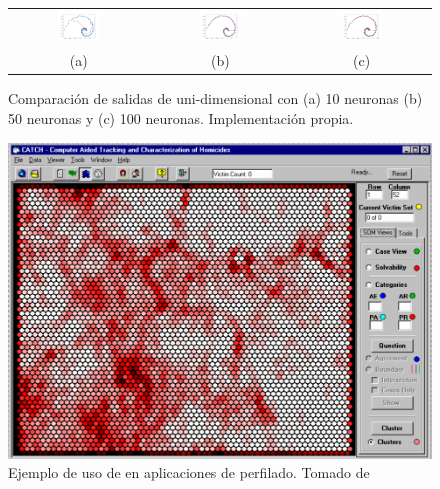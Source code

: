 \begin{figure}[H]
   \centering
   \begin{tabular}{ccc}
   \includegraphics[width=0.32\textwidth]{Figures/som-implementation-example10.pdf} & %
   \includegraphics[width=0.32\textwidth]{Figures/som-implementation-example50.pdf} & %
   \includegraphics[width=0.32\textwidth]{Figures/som-implementation-example100.pdf} \\
     (a) & (b) & (c) \\ [1em]
   \end{tabular}
   \decoRule
   \caption[Comparación de salidas de  uni-dimensional]{Comparación de salidas de  uni-dimensional con (a) 10 neuronas (b) 50 neuronas y (c) 100 neuronas. Implementación propia.}
   \label{fig:som-impl-example-fitting}
\end{figure}

\begin{figure}[H]
\centering
\includegraphics[width=\textwidth]{Figures/som-example.png}
\decoRule
\caption[Ejemplo de uso de  en aplicaciones de perfilado]{Ejemplo de uso de  en aplicaciones de perfilado. Tomado de \cite{mena2003investigative}}
\label{fig:som-example}
\end{figure}

